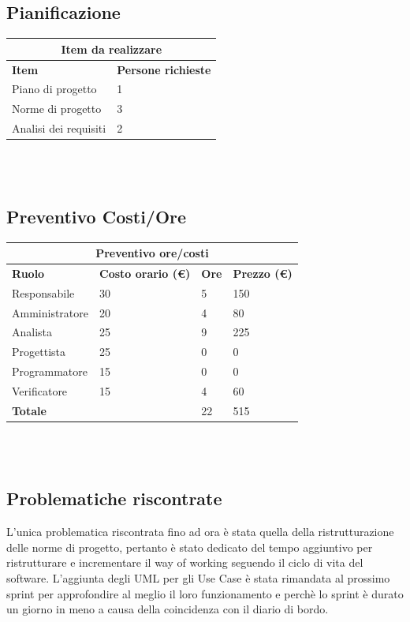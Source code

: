 \documentclass[12pt]{article}
\begin{document}
\subsection{Pianificazione}
\begin{center}
    \begin{tabularx}{\textwidth}{|X|X|}
        \hline
        \multicolumn{2}{|c|}{\textbf{Item da realizzare}}\\
        \hline
        \hline
        \textbf{Item} & \textbf{Persone richieste}\\
        \hline
        Piano di progetto & 1\\
        \hline
        Norme di progetto & 3\\
        \hline
        Analisi dei requisiti & 2 \\
        \hline
    \end{tabularx}\\[8pt]
    \mbox{}\\
\end{center}
\subsection{Preventivo Costi/Ore}
\begin{center}
    \begin{tabularx}{\textwidth}{|X|X|X|X|}
        \hline
        \multicolumn{4}{|c|}{\textbf{Preventivo ore/costi}}\\
        \hline
        \hline
        \textbf{Ruolo} & \textbf{Costo orario (\euro)} & \textbf{Ore} & \textbf{Prezzo (\euro)}\\
        \hline
        Responsabile    & 30 & 5  & 150\\   
        \hline
        Amministratore  & 20 & 4  & 80\\ 
        \hline
        Analista        & 25 & 9  & 225\\ 
        \hline
        Progettista     & 25 & 0  & 0\\
        \hline
        Programmatore   & 15 & 0  & 0\\
        \hline
        Verificatore    & 15 & 4  & 60\\
        \hline
        \hline
        \textbf{Totale} &    & 22 & 515\\
        \hline
    \end{tabularx}\\[8pt]
    \mbox{}\\
\end{center}
\subsection{Problematiche riscontrate}
L'unica problematica riscontrata fino ad ora è stata quella della ristrutturazione delle norme di progetto, pertanto è stato dedicato del tempo aggiuntivo per ristrutturare e incrementare il way of working seguendo il ciclo di vita del software.
L'aggiunta degli UML per gli Use Case è stata rimandata al prossimo sprint per approfondire al meglio il loro funzionamento e perchè lo sprint è durato un giorno in meno a causa della coincidenza con il diario di bordo.
\end{document}
